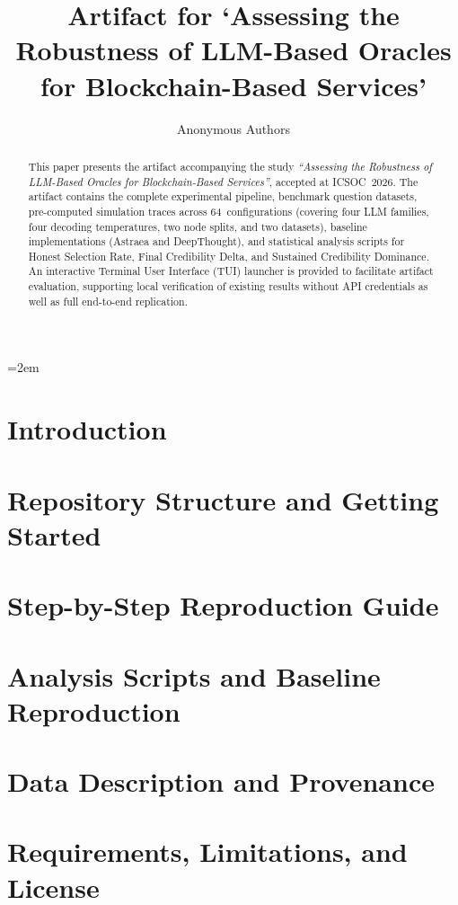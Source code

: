 \documentclass[runningheads]{llncs}
\begin{document}
\emergencystretch=2em

\title{Artifact for `Assessing the Robustness of LLM-Based Oracles for Blockchain-Based Services'}

\author{Anonymous Authors}

\maketitle

\begin{abstract}
This paper presents the artifact accompanying the study \emph{``Assessing the Robustness of LLM-Based Oracles for Blockchain-Based Services''}, accepted at ICSOC~2026. The artifact contains the complete experimental pipeline, benchmark question datasets, pre-computed simulation traces across 64~configurations (covering four LLM families, four decoding temperatures, two node splits, and two datasets), baseline implementations (Astraea and DeepThought), and statistical analysis scripts for Honest Selection Rate, Final Credibility Delta, and Sustained Credibility Dominance. An interactive Terminal User Interface (TUI) launcher is provided to facilitate artifact evaluation, supporting local verification of existing results without API credentials as well as full end-to-end replication.
\end{abstract}


\section{Introduction}
\label{sec:introduction}


\section{Repository Structure and Getting Started}
\label{sec:structure}


\section{Step-by-Step Reproduction Guide}
\label{sec:pipeline}


\section{Analysis Scripts and Baseline Reproduction}
\label{sec:analysis}


\section{Data Description and Provenance}
\label{sec:data}


\section{Requirements, Limitations, and License}
\label{sec:limitations}




\end{document}
